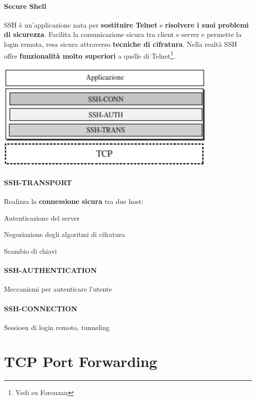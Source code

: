 \documentclass[10pt]{article}
\begin{document}
\paragraph{Secure Shell} SSH è un'applicazione nata per \textbf{sostituire Telnet} e \textbf{risolvere i suoi problemi di sicurezza}. Facilita la comunicazione sicura tra client e server e permette la login remota, resa sicura attraverso \textbf{tecniche di cifratura}. Nella realtà SSH offre \textbf{funzionalità molto superiori} a quelle di Telnet\footnote{Vedi su Forouzan}.
\begin{multicols}{2}
\includegraphics[scale=0.55]{stackssh.png}\\
\columnbreak

\paragraph{SSH-TRANSPORT} Realizza la \textbf{connessione sicura} tra due host:
\begin{list}{}{}
\item Autenticazione del server
\item Negoziazione degli algoritmi di cifratura
\item Scambio di chiavi
\end{list}
\paragraph{SSH-AUTHENTICATION} Meccanismi per autenticare l'utente
\paragraph{SSH-CONNECTION} Sessioen di login remoto, tunneling
\end{multicols}
\section{TCP Port Forwarding}
\end{document}
